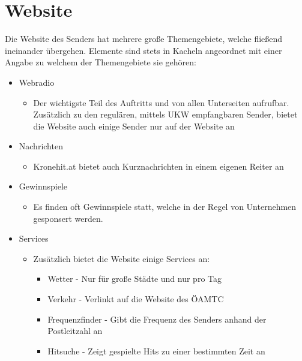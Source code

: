 \documentclass{article}
\begin{document}
	\section{Website}
	Die Website des Senders hat mehrere große Themengebiete, welche fließend ineinander übergehen. Elemente sind stets in Kacheln angeordnet mit einer Angabe zu welchem der Themengebiete sie gehören:
	\begin{itemize}
		\item{Webradio}
		\begin{itemize}
			\item{Der wichtigste Teil des Auftritts und von allen Unterseiten aufrufbar. Zusätzlich zu den regulären, mittels UKW empfangbaren Sender, bietet die Website auch einige Sender nur auf der Website an}
		\end{itemize}
		\item{Nachrichten}
		\begin{itemize}
			\item{Kronehit.at bietet auch Kurznachrichten in einem eigenen Reiter an}
		\end{itemize}
		\item{Gewinnspiele}
		\begin{itemize}
			\item{Es finden oft Gewinnspiele statt, welche in der Regel von Unternehmen gesponsert werden.}
		\end{itemize}
		\item{Services}
		\begin{itemize}
			\item{Zusätzlich bietet die Website einige Services an:}
			\begin{itemize}
				\item{Wetter - Nur für große Städte und nur pro Tag}
				\item{Verkehr - Verlinkt auf die Website des ÖAMTC}
				\item{Frequenzfinder - Gibt die Frequenz des Senders anhand der Postleitzahl an}
				\item{Hitsuche - Zeigt gespielte Hits zu einer bestimmten Zeit an}
			\end{itemize}
		\end{itemize}
	\end{itemize}
\end{document}

